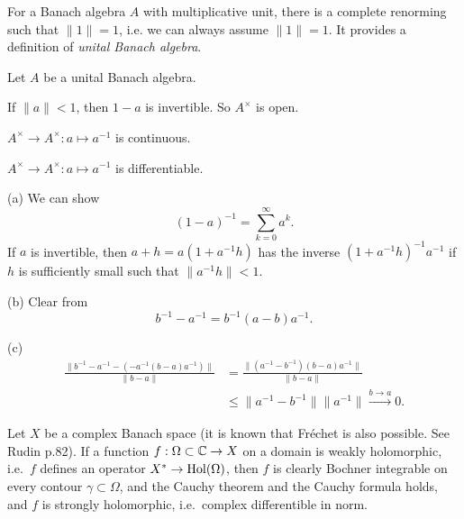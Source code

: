 \documentclass{../../large}
\begin{document}
\begin{prb}
For a Banach algebra $A$ with multiplicative unit, there is a complete renorming such that $\|1\|=1$, i.e. we can always assume $\|1\|=1$.
It provides a definition of \emph{unital Banach algebra}.

Let $A$ be a unital Banach algebra.
\begin{parts}
\item If $\|a\|<1$, then $1-a$ is invertible. So $A^\times$ is open.
\item $A^\times\to A^\times:a\mapsto a^{-1}$ is continuous.
\item $A^\times\to A^\times:a\mapsto a^{-1}$ is differentiable.
\end{parts}
\end{prb}
\begin{pf}
(a)
We can show
\[(1-a)^{-1}=\sum_{k=0}^\infty a^k.\]
If $a$ is invertible, then $a+h=a(1+a^{-1}h)$ has the inverse $(1+a^{-1}h)^{-1}a^{-1}$ if $h$ is sufficiently small such that $\|a^{-1}h\|<1$.

(b)
Clear from
\[b^{-1}-a^{-1}=b^{-1}(a-b)a^{-1}.\]

(c)
\begin{align*}
\frac{\|b^{-1}-a^{-1}-(-a^{-1}(b-a)a^{-1})\|}{\|b-a\|}
&=\frac{\|(a^{-1}-b^{-1})(b-a)a^{-1}\|}{\|b-a\|}\\
&\le\|a^{-1}-b^{-1}\|\|a^{-1}\|\xrightarrow{b\to a}0.
\end{align*}
\end{pf}

\begin{prb}
Let $X$ be a complex Banach space (it is known that Fr\'echet is also possible. See Rudin p.82).
If a function $f:\Omega\subset\mathbb{C}\to X$ on a domain is weakly holomorphic, i.e.~$f$ defines an operator $X^*\to\operatorname{Hol}(\Omega)$, then $f$ is clearly Bochner integrable on every contour $\gamma\subset\Omega$, and the Cauchy theorem and the Cauchy formula holds, and $f$ is strongly holomorphic, i.e.~complex differentible in norm.
\end{prb}
\end{document}
